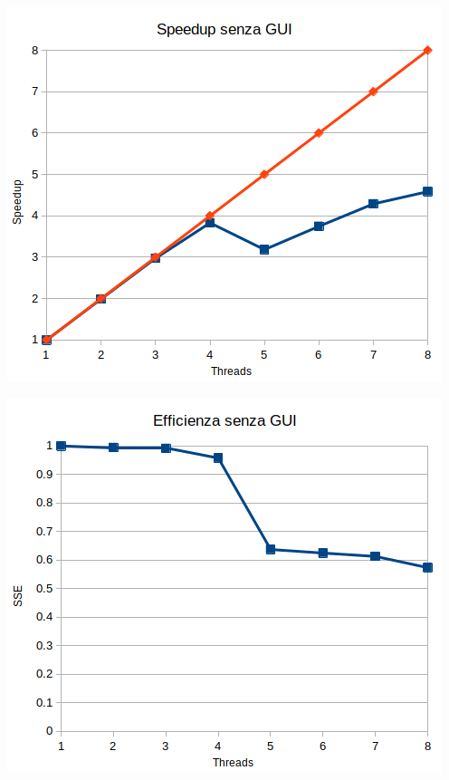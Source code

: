 \documentclass[12pt,a4paper,oneside]{article}
\begin{document}
	\hfill
	\begin{minipage}{.45\textwidth}
		\centering
		\includegraphics[width=\linewidth]{speedup-no-gui}
		\label{fig:speedup-no-gui}
	\end{minipage}
	\hfill
	\begin{minipage}{.45\textwidth}
		\centering
		\includegraphics[width=\linewidth]{sse-no-gui}
		\label{fig:sse-no-gui}
	\end{minipage}
	\hfill
	
\end{document}
